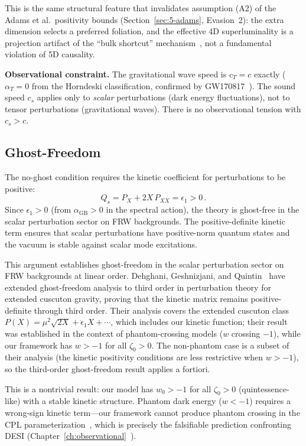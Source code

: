 This is the same structural feature that invalidates assumption (A2) of the Adams et al.\ positivity bounds (Section~\ref{sec:5-adams}, Evasion~2): the extra dimension selects a preferred foliation, and the effective 4D superluminality is a projection artifact of the ``bulk shortcut'' mechanism~\cite{ch5:ChungFreese2000}, not a fundamental violation of 5D causality.

\textbf{Observational constraint.} The gravitational wave speed is $c_T = c$ exactly ($\alpha_T = 0$ from the Horndeski classification, confirmed by GW170817~\cite{ch5:GW170817}). The sound speed $c_s$ applies only to \emph{scalar} perturbations (dark energy fluctuations), not to tensor perturbations (gravitational waves). There is no observational tension with $c_s > c$.

\subsection{Ghost-Freedom}
\label{sec:5-ghost-freedom}

The no-ghost condition requires the kinetic coefficient for perturbations to be positive:
\begin{equation}
  Q_s = P_X + 2X\,P_{XX} = \epsilon_1 > 0\,.
  \label{eq:5-17}
\end{equation}
Since $\epsilon_1 > 0$ (from $\alpha_\mathrm{GB} > 0$ in the spectral action), the theory is ghost-free in the scalar perturbation sector on FRW backgrounds. The positive-definite kinetic term ensures that scalar perturbations have positive-norm quantum states and the vacuum is stable against scalar mode excitations.

This argument establishes ghost-freedom in the scalar perturbation sector on FRW backgrounds at linear order. Dehghani, Geshnizjani, and Quintin~\cite{ch5:DehghaniGQ2025} have extended ghost-freedom analysis to third order in perturbation theory for extended cuscuton gravity, proving that the kinetic matrix remains positive-definite through third order. Their analysis covers the extended cuscuton class $P(X) = \mu^2\sqrt{2X} + \epsilon_1 X + \cdots$, which includes our kinetic function; their result was established in the context of phantom-crossing models ($w$ crossing $-1$), while our framework has $w > -1$ for all $\zeta_0 > 0$. The non-phantom case is a subset of their analysis (the kinetic positivity conditions are less restrictive when $w > -1$), so the third-order ghost-freedom result applies a fortiori.

This is a nontrivial result: our model has $w_0 > -1$ for all $\zeta_0 > 0$ (quintessence-like) with a stable kinetic structure. Phantom dark energy ($w < -1$) requires a wrong-sign kinetic term---our framework cannot produce phantom crossing in the CPL parameterization~\cite{ch5:Linder2003}, which is precisely the falsifiable prediction confronting DESI (Chapter~\ref{ch:observational}~\cite{ch5:PaperII}).

